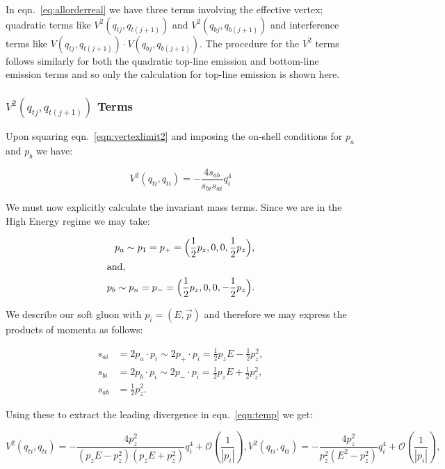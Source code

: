 		In eqn.~\eqref{eq:allorderreal} we have three terms involving the effective vertex;
		quadratic terms like $V^2(q_{tj}, q_{t(j+1)})$ and $V^2(q_{bj}, q_{b(j+1)})$ and interference terms
		like $V(q_{tj}, q_{t(j+1)})\cdot V(q_{bj}, q_{b(j+1)})$.  The procedure for the $V^2$ terms follows
		similarly for both the quadratic top-line emission and bottom-line emission terms and so only
		the calculation for top-line emission is shown here.

		\subsubsection{$V^2(q_{tj}, q_{t(j+1)})$ Terms}

			Upon squaring eqn.~\eqref{eqn:vertexlimit2} and imposing the on-shell conditions for
			$p_a$ and $p_b$ we have:

			\begin{equation}
				V^2(q_{ti}, q_{ti}) = - \frac{4s_{ab}}{s_{bi}s_{ai}}q^4_{i}
				\label{eqn:temp}
			\end{equation}

			We must now explicitly calculate the invariant mass terms.  Since we are in the
			High Energy regime we may take:

			\begin{align}
				p_a\sim p_1 = p_+ = \Big(\frac12 p_z, 0, 0, \frac12 p_z\Big),\\
				\intertext{and,}
				p_b\sim p_n = p_- = \Big(\frac12 p_z, 0, 0, -\frac12 p_z\Big).
			\end{align}

			We describe our soft gluon with $p_i=(E, \vec{p})$ and therefore we may express the
			products of momenta as follows:

			\begin{align}
				s_{ai} &= 2p_a\cdot p_i\sim2p_+\cdot p_i = \frac12p_zE - \frac12p_z^2,\\
				s_{bi} &= 2p_b\cdot p_i\sim2p_-\cdot p_i = \frac12p_zE + \frac12p_z^2,\\
				s_{ab} &= \frac12p_z^2.
			\end{align}

			Using these to extract the leading divergence in eqn.~\eqref{eqn:temp} we get:

			\begin{subequations}
				\begin{equation}
				V^2(q_{ti}, q_{ti}) = - \frac{4p_z^2}{(p_zE - p_z^2)(p_zE + p_z^2)}q^4_{i} + \mathcal{O}\left(\frac{1}{|p_i|}\right),
				\end{equation}
				\begin{equation}
				V^2(q_{ti}, q_{ti}) = - \frac{4p_z^2}{p_z^2(E^2-p_z^2)}q^4_{i} + \mathcal{O}\left(\frac{1}{|p_i|}\right),
				\end{equation}
			\end{subequations}

